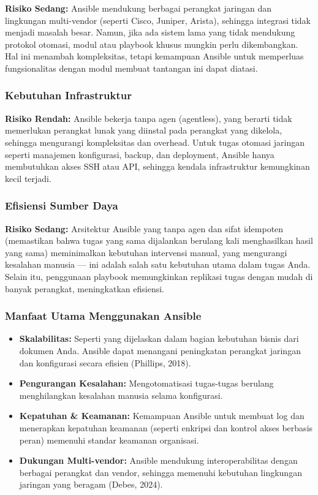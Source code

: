 \textbf{Risiko Sedang:} Ansible mendukung berbagai perangkat jaringan dan lingkungan multi-vendor (seperti Cisco, Juniper, Arista), sehingga integrasi tidak menjadi masalah besar. Namun, jika ada sistem lama yang tidak mendukung protokol otomasi, modul atau playbook khusus mungkin perlu dikembangkan. Hal ini menambah kompleksitas, tetapi kemampuan Ansible untuk memperluas fungsionalitas dengan modul membuat tantangan ini dapat diatasi.

\subsubsection{Kebutuhan Infrastruktur}

\textbf{Risiko Rendah:} Ansible bekerja tanpa agen (agentless), yang berarti tidak memerlukan perangkat lunak yang diinstal pada perangkat yang dikelola, sehingga mengurangi kompleksitas dan overhead. Untuk tugas otomasi jaringan seperti manajemen konfigurasi, backup, dan deployment, Ansible hanya membutuhkan akses SSH atau API, sehingga kendala infrastruktur kemungkinan kecil terjadi.

\subsubsection{Efisiensi Sumber Daya}

\textbf{Risiko Sedang:} Arsitektur Ansible yang tanpa agen dan sifat idempoten (memastikan bahwa tugas yang sama dijalankan berulang kali menghasilkan hasil yang sama) meminimalkan kebutuhan intervensi manual, yang mengurangi kesalahan manusia — ini adalah salah satu kebutuhan utama dalam tugas Anda. Selain itu, penggunaan playbook memungkinkan replikasi tugas dengan mudah di banyak perangkat, meningkatkan efisiensi.

\subsubsection{Manfaat Utama Menggunakan Ansible}

\begin{itemize}
    \item \textbf{Skalabilitas:} Seperti yang dijelaskan dalam bagian kebutuhan bisnis dari dokumen Anda. Ansible dapat menangani peningkatan perangkat jaringan dan konfigurasi secara efisien (Phillips, 2018).
    \item \textbf{Pengurangan Kesalahan:} Mengotomatisasi tugas-tugas berulang menghilangkan kesalahan manusia selama konfigurasi.
    \item \textbf{Kepatuhan \& Keamanan:} Kemampuan Ansible untuk membuat log dan menerapkan kepatuhan keamanan (seperti enkripsi dan kontrol akses berbasis peran) memenuhi standar keamanan organisasi.
    \item \textbf{Dukungan Multi-vendor:} Ansible mendukung interoperabilitas dengan berbagai perangkat dan vendor, sehingga memenuhi kebutuhan lingkungan jaringan yang beragam (Debes, 2024).
\end{itemize}

